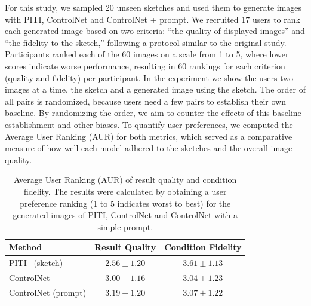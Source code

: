 For this study, we sampled 20 unseen sketches and used them to generate images with PITI, ControlNet and ControlNet + prompt. We recruited 17 users to rank each generated image based on two criteria: “the quality of displayed images” and “the fidelity to the sketch,” following a protocol similar to the original study. Participants ranked each of the 60 images on a scale from 1 to 5, where lower scores indicate worse performance, resulting in 60 rankings for each criterion (quality and fidelity) per participant. In the experiment we show the users two images at a time, the sketch and a generated image using the sketch. The order of all pairs is randomized, because users need a few pairs to establish their own baseline. By randomizing the order, we aim to counter the effects of this baseline establishment and other biases. To quantify user preferences, we computed the Average User Ranking (AUR) for both metrics, which served as a comparative measure of how well each model adhered to the sketches and the overall image quality.
\begin{table}[hbp]
    \begin{center}
        \caption{Average User Ranking (AUR) of result quality and
            condition fidelity. The results were calculated by obtaining a user preference ranking (1 to 5 indicates worst to best) for the generated images of PITI, ControlNet and ControlNet with a simple prompt.}
        \label{tab:controlnet:experiment}
        \def\arraystretch{1.1}
        \begin{tabular}{lcc}
            \toprule
            \textbf{Method}                                                     & \textbf{Result Quality} & \textbf{Condition Fidelity} \\
            \midrule
            PITI~\cite{wang2022pretrainingneedimagetoimagetranslation} (sketch) & $2.56 \pm 1.20$         & $3.61 \pm 1.13$             \\
            ControlNet                                                          & $3.00 \pm 1.16$         & $3.04 \pm 1.23$             \\
            ControlNet (prompt)                                                 & $3.19 \pm 1.20$         & $3.07 \pm 1.22$             \\
            \bottomrule
        \end{tabular}
    \end{center}
\end{table}


